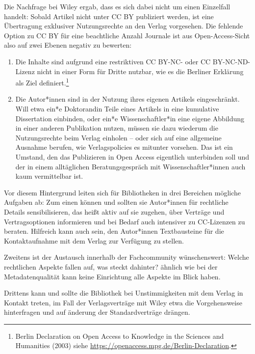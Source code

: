 \documentclass[a4paper,
fontsize=11pt,
oneside,
numbers=noperiodatend,
parskip=half-,
bibliography=totoc,
final
]{scrartcl}
\begin{document}
Die Nachfrage bei Wiley ergab, dass es sich dabei nicht um einen
Einzelfall handelt: Sobald Artikel nicht unter CC BY publiziert werden,
ist eine Übertragung exklusiver Nutzungsrechte an den Verlag vorgesehen.
Die fehlende Option zu CC BY für eine beachtliche Anzahl Journale ist
aus Open-Access-Sicht also auf zwei Ebenen negativ zu bewerten:

\begin{enumerate}
\def\labelenumi{\arabic{enumi}.}
\item
  Die Inhalte sind aufgrund eine restriktiven CC BY-NC- oder CC
  BY-NC-ND-Lizenz nicht in einer Form für Dritte nutzbar, wie es die
  Berliner Erklärung als Ziel definiert.\footnote{Berlin Declaration on
    Open Access to Knowledge in the Sciences and Humanities (2003) siehe
    \url{https://openaccess.mpg.de/Berlin-Declaration}.}
\item
  Die Autor*innen sind in der Nutzung ihres eigenen Artikels
  eingeschränkt. Will etwa ein*e Doktorandin Teile eines Artikels in
  eine kumulative Dissertation einbinden, oder ein*e Wissenschaftler*in
  eine eigene Abbildung in einer anderen Publikation nutzen, müssen sie
  dazu wiederum die Nutzungsrechte beim Verlag einholen -- oder sich auf
  eine allgemeine Ausnahme berufen, wie Verlagspolicies es mitunter
  vorsehen. Das ist ein Umstand, den das Publizieren in Open Access
  eigentlich unterbinden soll und der in einem alltäglichen
  Beratungsgespräch mit Wissenschaftler*innen auch kaum vermittelbar
  ist.
\end{enumerate}

Vor diesem Hintergrund leiten sich für Bibliotheken in drei Bereichen
mögliche Aufgaben ab: Zum einen können und sollten sie Autor*innen für
rechtliche Details sensibilisieren, das heißt aktiv auf sie zugehen,
über Verträge und Vertragsoptionen informieren und bei Bedarf auch
intensiver zu CC-Lizenzen zu beraten. Hilfreich kann auch sein, den
Autor*innen Textbausteine für die Kontaktaufnahme mit dem Verlag zur
Verfügung zu stellen.

Zweitens ist der Austausch innerhalb der Fachcommunity wünschenswert:
Welche rechtlichen Aspekte fallen auf, was steckt dahinter? ähnlich wie
bei der Metadatenqualität kann keine Einrichtung alle Aspekte im Blick
haben.

Drittens kann und sollte die Bibliothek bei Unstimmigkeiten mit dem
Verlag in Kontakt treten, im Fall der Verlagsverträge mit Wiley etwa die
Vorgehensweise hinterfragen und auf änderung der Standardverträge
drängen.
\end{document}
